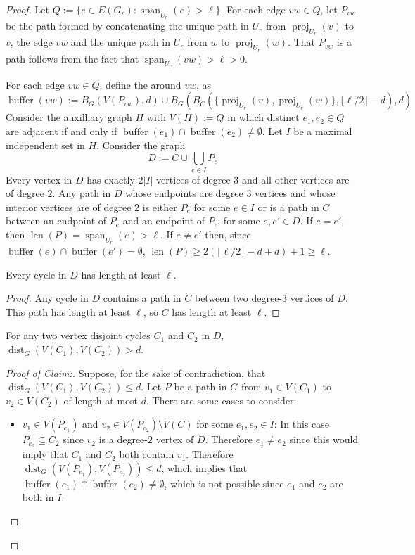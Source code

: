 \documentclass{patmorin}
\newenvironment{clmproof}{\begin{proof}[Proof of Claim:]\renewcommand{\qedsymbol}{\rule{1ex}{1ex}}}{\end{proof}}
\DeclareMathOperator{\len}{len}
\DeclareMathOperator{\buffer}{buffer}
\DeclareMathOperator{\proj}{proj}
\DeclareMathOperator{\spn}{span}
\DeclareMathOperator{\dist}{dist}
\begin{document}
\begin{proof}
  Let $Q:=\{e\in E(G_r):\spn_{U_r}(e)>\ell\}$.  For each edge $vw\in Q$, let $P_{vw}$ be the path formed by concatenating the unique path in $U_r$ from $\proj_{U_r}(v)$ to $v$, the edge $vw$ and the unique path in $U_r$ from $w$ to $\proj_{U_r}(w)$.  That $P_{vw}$ is a path follows from the fact that $\spn_{U_r}(vw)>\ell>0$.

  For each edge $vw\in Q$, define the  around $vw$, as
  \[
    \buffer(vw):= B_G(V(P_{vw}),d)\cup B_G(B_C(\{\proj_{U_r}(v),\proj_{U_r}(w)\},\lfloor\ell/2\rfloor-d),d)
  \]
  Consider the auxilliary graph $H$ with $V(H):=Q$ in which distinct $e_1,e_2\in Q$ are adjacent if and only if $\buffer(e_1)\cap\buffer(e_2)\neq\emptyset$. Let $I$ be a maximal independent set in $H$.  Consider the graph
  \[
    D:=C\cup \bigcup_{e\in I} P_e
  \]
  Every vertex in $D$ has exactly $2|I|$ vertices of degree $3$ and all other vertices are of degree $2$.  Any path in $D$ whose endpoints are degree $3$ vertices and whose interior vertices are of degree $2$ is either $P_e$ for some $e\in I$ or is a path in $C$ between an endpoint of $P_e$ and an endpoint of $P_{e'}$ for some $e,e'\in D$.  If $e=e'$, then $\len(P)=\spn_{U_r}(e)>\ell$.  If $e\neq e'$ then, since $\buffer(e)\cap\buffer(e')=\emptyset$, $\len(P)\ge 2(\lfloor\ell/2\rfloor-d+d)+1\ge\ell$.
  \begin{clm}
    Every cycle in $D$ has length at least $\ell$.
  \end{clm}
  \begin{proof}
    Any cycle in $D$ contains a path in $C$ between two degree-$3$ vertices of $D$.  This path has length at least $\ell$, so $C$ has length at least $\ell$.
  \end{proof}

  \begin{clm}
    For any two vertex disjoint cycles $C_1$ and $C_2$ in $D$, $\dist_G(V(C_1),V(C_2))> d$.
  \end{clm}

  \begin{clmproof}
    Suppose, for the sake of contradiction, that $\dist_G(V(C_1),V(C_2))\le d$. Let $P$ be a path in $G$ from $v_1\in V(C_1)$ to $v_2\in V(C_2)$ of length at most $d$.  There are some cases to consider:
    \begin{itemize}

      \item $v_1\in V(P_{e_1})$ and $v_2\in V(P_{e_2})\setminus V(C)$ for some $e_1,e_2\in I$:  In this case $P_{e_2}\subseteq C_2$ since $v_2$ is a degree-$2$ vertex of $D$.  Therefore $e_1\neq e_2$ since this would imply that $C_1$ and $C_2$ both contain $v_1$.  Therefore $\dist_G(V(P_{e_1}),V(P_{e_2}))\le d$, which implies that $\buffer(e_1)\cap\buffer(e_2)\neq\emptyset$, which is not possible since $e_1$ and $e_2$ are both in $I$.


\end{itemize}
\end{clmproof}
\end{proof}
\end{document}
